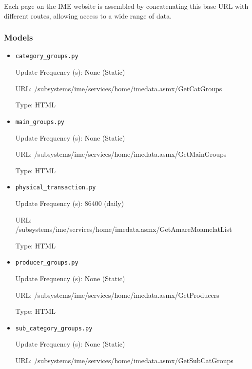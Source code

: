 {	Each page on the IME website is assembled by concatenating this base URL with different routes, allowing access to a wide range of data.

	\subsubsection{Models}

	\begin{itemize}
		\item \texttt{category\_groups.py}

		Update Frequency (s): None (Static)

		URL: /subsystems/ime/services/home/imedata.asmx/GetCatGroups

		Type: HTML


		\item \texttt{main\_groups.py}

		Update Frequency (s): None (Static)

		URL: /subsystems/ime/services/home/imedata.asmx/GetMainGroups

		Type: HTML


		\item \texttt{physical\_transaction.py}

		Update Frequency (s): 86400 (daily)

		URL: /subsystems/ime/services/home/imedata.asmx/GetAmareMoamelatList

		Type: HTML


		\item \texttt{producer\_groups.py}

		Update Frequency (s): None (Static)

		URL: /subsystems/ime/services/home/imedata.asmx/GetProducers

		Type: HTML


		\item \texttt{sub\_category\_groups.py}

		Update Frequency (s): None (Static)

		URL: /subsystems/ime/services/home/imedata.asmx/GetSubCatGroups


\end{itemize}}
